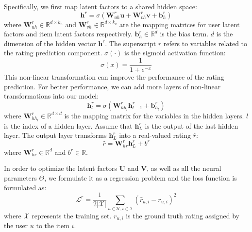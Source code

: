 \documentclass[sigconf]{acmart}
\begin{document}
Specifically, we first map latent factors to a shared hidden space:
\begin{equation}
{\mathbf{h}^r} = \sigma (\mathbf{W}_{uh}^r\mathbf{u} + \mathbf{W}_{vh}^r\mathbf{v} + \mathbf{b}_h^r)
\label{eq:hr}
\end{equation}
where $\mathbf{W}_{uh}^r \in \mathbb{R}^{d \times k_u}$ and $\mathbf{W}_{vh}^r \in \mathbb{R}^{d \times k_v}$ are the mapping matrices for user latent factors and item latent factors respectively. $\mathbf{b}_h^r \in \mathbb{R}^{d}$ is the bias term. $d$ is the dimension of the hidden vector ${\mathbf{h}^r}$.
The superscript $r$ refers to variables related to the rating prediction component.
$\sigma(\cdot)$ is the sigmoid activation function:
\begin{equation}
\sigma (x) = \frac{1}{{1 + {e^{ - x}}}}
\end{equation}
This non-linear transformation can improve the performance of the rating prediction.
For better performance, we can add more layers of non-linear transformations into our model:
\begin{equation}
{\mathbf{h}^r_l} = \sigma (\mathbf{W}_{h{h_l}}^r\mathbf{h}^r_{l-1} + \mathbf{b}_{{h_l}}^r)
\end{equation}
where $\mathbf{W}_{h{h_l}}^r \in \mathbb{R}^{d \times d}$ is the mapping matrix for the variables in the hidden layers. $l$ is the index of a hidden layer.
Assume that $\mathbf{h}^r_L$ is the output of the last hidden layer.
The output layer transforms $\mathbf{h}^r_L$ into a real-valued rating $\hat r$:
\begin{equation}
{\hat r} = \mathbf{W}_{hr}^r\mathbf{h}^r_{L} + b^r
\label{eq:pred_r}
\end{equation}
where $\mathbf{W}_{hr}^r \in \mathbb{R}^{ d}$ and $b^r \in \mathbb{R}$.

In order to optimize the latent factors $\mathbf{U}$ and $\mathbf{V}$, as well as all the neural parameters $\Theta$,
we formulate it as a regression problem and  the loss function is formulated as:
\begin{equation}
{\mathcal{L}^r} = \frac{1}{{2\left| \mathcal{X} \right|}}{\sum\limits_{u\in \mathcal{U},i \in \mathcal{I}} {({{\hat r}_{u,i}} - {r_{u,i}})} ^2}
\label{eq:lossr}
\end{equation}
where $\mathcal{X}$ represents the training set. $r_{u,i}$ is the ground truth rating assigned by the user $u$ to the item $i$.
\end{document}
